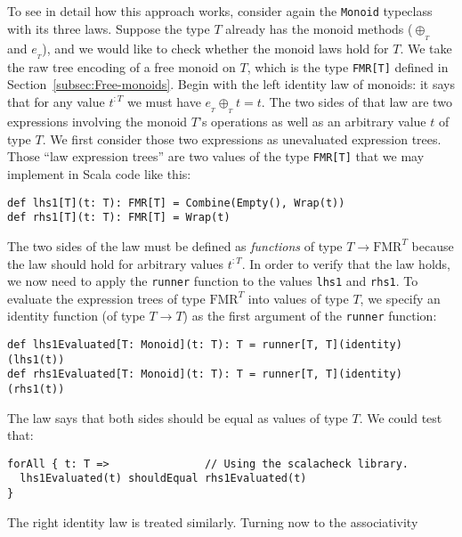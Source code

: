 To see in detail how this approach works, consider again the \lstinline!Monoid!
typeclass with its three laws. Suppose the type $T$ already has the
monoid methods ($\oplus_{_{T}}$ and $e_{_{T}}$), and we would like
to check whether the monoid laws hold for $T$. We take the raw tree
encoding of a free monoid on $T$, which is the type \lstinline!FMR[T]!
defined in Section~\ref{subsec:Free-monoids}. Begin with the left
identity law of monoids: it says that for any value $t^{:T}$ we must
have $e_{_{T}}\oplus_{_{T}}t=t$. The two sides of that law are two
expressions involving the monoid $T$\textsf{'}s operations as well as an arbitrary
value $t$ of type $T$. We first consider those two expressions as
unevaluated expression trees. Those \textsf{``}law expression trees\textsf{''} are
two values of the type \lstinline!FMR[T]!
that we may implement in Scala code like this:
\begin{lstlisting}
def lhs1[T](t: T): FMR[T] = Combine(Empty(), Wrap(t))
def rhs1[T](t: T): FMR[T] = Wrap(t)
\end{lstlisting}
The two sides of the law must be defined as \emph{functions} of type
$T\rightarrow\text{FMR}^{T}$ because the law should hold for arbitrary
values $t^{:T}$. In order to verify that the law holds, we now need
to apply the \lstinline!runner!
function to the values \lstinline!lhs1!
and \lstinline!rhs1!. To
evaluate the expression trees of type $\text{FMR}^{T}$ into values
of type $T$, we specify an identity function (of type $T\rightarrow T$)
as the first argument of the \lstinline!runner!
function:
\begin{lstlisting}
def lhs1Evaluated[T: Monoid](t: T): T = runner[T, T](identity)(lhs1(t))
def rhs1Evaluated[T: Monoid](t: T): T = runner[T, T](identity)(rhs1(t))
\end{lstlisting}
The law says that both sides should be equal as values of type $T$.
We could test that:
\begin{lstlisting}
forAll { t: T =>               // Using the scalacheck library.
  lhs1Evaluated(t) shouldEqual rhs1Evaluated(t)
}
\end{lstlisting}
The right identity law is treated similarly. Turning now to the associativity
